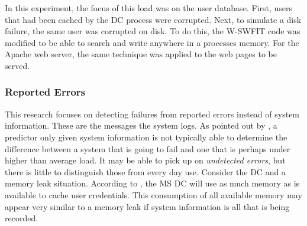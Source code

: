 In this experiment, the focus of this load was on the user database.  First,
users that had been cached by the \ac{DC} process were corrupted.  Next, to
simulate a disk failure, the same user was corrupted on disk.  To do this, the
\ac{W-SWFIT} code was modified to be able to search and write anywhere in a
processes memory.  For the Apache web server, the same technique was applied to
the web pages to be served.

\subsubsection{Reported Errors} \label{sec:extReportedErrors}
This research focuses on detecting failures from reported errors instead of
system information.  These are the messages the system logs.  As pointed out by
\citet{salfnerSurvey}, a predictor only given system information is not
typically able to determine the difference between a system that is going to
fail and one that is perhaps under higher than average load.  It may be able to
pick up on \emph{undetected errors}, but there is little to distinguish those
from every day use.  Consider the \ac{DC} and a memory leak situation.
According to \citet{russinovich2009}, the \ac{MS} \ac{DC} will use as much
memory as is available to cache user credentials.  This consumption of all
available memory may appear very similar to a memory leak if system information
is all that is being recorded.
